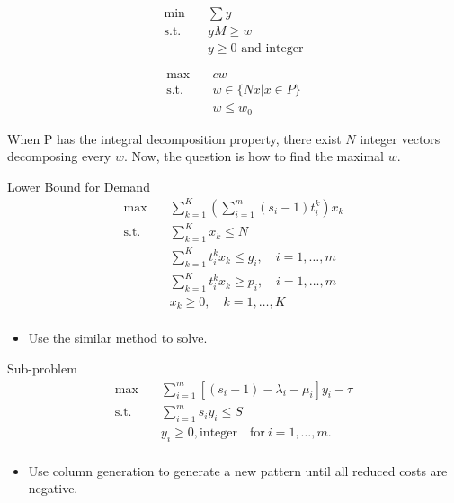    \begin{frame}{}
      \[\begin{split}\mbox{min}\quad & \sum y \\
      \mbox{s.t.} \quad & yM \geq w \\
      & y \geq 0 \mbox{ and integer}\end{split}\]

      \[\begin{split}\mbox{max}\quad & c w \\
      \mbox{s.t.} \quad & w \in \{Nx| x \in P\} \\
      & w \leq w_0\end{split}\]

      When P has the integral decomposition property, there exist $N$ integer vectors decomposing every $w$.
      Now, the question is how to find the maximal $w$.
    \end{frame}


    \begin{frame}{Lower Bound for Demand}
      \[\begin{split}\mbox{max}\quad & \sum_{k=1}^K(\sum_{i=1}^m (s_i-1)t_i^k) x_{k}\\
      \mbox{s.t.} \quad & \sum_{k=1}^K x_{k} \leq N \\
      & \sum_{k=1}^K t_i^k x_k \leq g_i,\quad i=1,\ldots,m\\
      & \sum_{k=1}^K t_i^k x_k \geq p_i,\quad i=1,\ldots,m\\
      & x_{k} \geq 0, \quad k = 1,\ldots,K \\
      \end{split}\]
      \begin{itemize}
        \item Use the similar method to solve.
      \end{itemize}
    \end{frame}

    \begin{frame}{Sub-problem}
      \[\begin{split}\mbox{max}\quad & \sum_{i=1}^m \left[(s_i-1) -\lambda_i - \mu_i \right] y_{i} - \tau \\
      \mbox{s.t.} \quad & \sum_{i=1}^m s_i y_i \leq S  \\
      & y_i \geq 0, \mbox{integer}\quad \mbox{for}~ i=1,\ldots,m.\\\end{split}\]
      \begin{itemize}
        \item Use column generation to generate a new pattern until all reduced costs are negative.
      \end{itemize}
    \end{frame}


